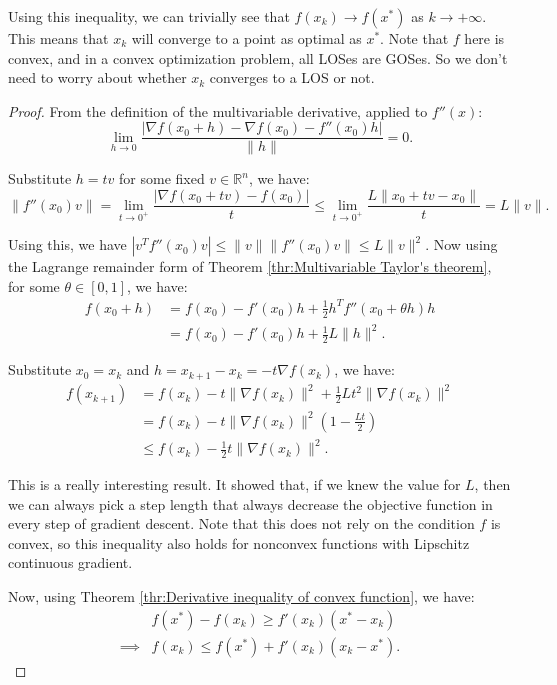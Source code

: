 Using this inequality, we can trivially see that \( f(x_{k}) \to f(x^{*}) \) as
\( k \to +\infty \). This means that \( x_{k} \) will converge to a point as
optimal as \( x^{*} \). Note that \( f \) here is convex, and in a convex
optimization problem, all LOSes are GOSes. So we don't need to worry about
whether \( x_{k} \) converges to a LOS or not.

\begin{proof}
  From the definition of the multivariable derivative, applied to \( f''(x) \):
  \[
    \lim_{h \to 0} \frac{|\nabla f(x_{0}+h)-\nabla f(x_{0}) - f''(x_{0})h|}{\|h\|} = 0
  .\] 

  Substitute \( h = tv \) for some fixed \( v \in \mathbb{R}^{n} \), we have:
  \[
    \|f''(x_{0})v\| = \lim_{t \to 0^{+}} \frac{|\nabla f(x_{0}+tv)-f(x_{0})|}{t} \le
    \lim_{t \to  0^{+}} \frac{L\|x_{0} + tv - x_{0}\|}{t} = L\|v\|
  .\] 

  Using this, we have \( |v^{T}f''(x_{0})v| \le \|v\| \|f''(x_{0})v\| \le
  L\|v\|^2\). Now using the Lagrange remainder form of Theorem
  \ref{thr:Multivariable Taylor's theorem}, for some \( \theta \in [0, 1] \), we have:
  \begin{align*}
    f(x_{0} + h) &= f(x_{0}) -f'(x_{0})h +\frac{1}{2} h^{T}f''(x_{0} + \theta h)h\\
                 &= f(x_{0})-f'(x_{0})h+\frac{1}{2} L\|h\|^2
  .\end{align*}

  Substitute \( x_{0} = x_{k} \) and \( h = x_{k+1} - x_{k} = -t\nabla f(x_{k})
  \), we have:
  \begin{align*}
    f(x_{k+1}) &= f(x_{k}) - t\|\nabla f(x_{k})\|^2 + \frac{1}{2}Lt^2\|\nabla
    f(x_{k})\|^2  \\
    &= f(x_{k}) - t\|\nabla f(x_{k})\|^2 \left( 1 - \frac{Lt}{2} \right)  \\
    &\le f(x_{k}) - \frac{1}{2}t \|\nabla f(x_{k})\|^2
  .\end{align*}

  This is a really interesting result. It showed that, if we knew the value for
  \( L \), then we can always pick a step length that always decrease the
  objective function in every step of gradient descent. Note that this does not
  rely on the condition \( f \) is convex, so this inequality also holds for
  nonconvex functions with Lipschitz continuous gradient.

  Now, using Theorem \ref{thr:Derivative inequality of convex function}, we
  have:
  \begin{align*}
    &f(x^{*}) - f(x_{k}) \ge f'(x_{k})(x^{*} - x_{k})\\
    \implies &f(x_{k})\le f(x^{*})+f'(x_{k})(x_{k}-x^{*})
  .\end{align*}


\end{proof}
